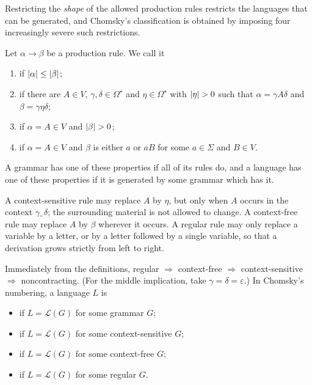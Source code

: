 \documentclass[a4paper]{scrartcl}
\newcommand{\lang}{\mathcal{L}}
\newcommand{\eps}{\varepsilon}
\begin{document}
Restricting the \emph{shape} of the allowed production rules restricts the languages that can be generated, and Chomsky's classification is obtained by imposing four increasingly severe such restrictions.

\begin{definition}
	Let $\alpha \to \beta$ be a production rule. We call it
	\begin{enumerate}[label=(\roman*)]
		\item {} if $\lvert\alpha\rvert \leq \lvert\beta\rvert$;
		\item {} if there are $A \in V$, $\gamma, \delta \in \Omega^\star$ and $\eta \in \Omega^\star$ with $\lvert\eta\rvert > 0$ such that $\alpha = \gamma A \delta$ and $\beta = \gamma\eta\delta$;
		\item {} if $\alpha = A \in V$ and $\lvert\beta\rvert > 0$;
		\item {} if $\alpha = A \in V$ and $\beta$ is either $a$ or $aB$ for some $a \in \Sigma$ and $B \in V$.
	\end{enumerate}
	A grammar has one of these properties if all of its rules do, and a language has one of these properties if it is generated by some grammar which has it.
\end{definition}

A context-sensitive rule may replace $A$ by $\eta$, but only when $A$ occurs in the context $\gamma \_\, \delta$; the surrounding material is not allowed to change. A context-free rule may replace $A$ by $\beta$ wherever it occurs. A regular rule may only replace a variable by a letter, or by a letter followed by a single variable, so that a derivation grows strictly from left to right.

Immediately from the definitions, regular $\Rightarrow$ context-free $\Rightarrow$ context-sensitive $\Rightarrow$ noncontracting. (For the middle implication, take $\gamma = \delta = \eps$.) In Chomsky's numbering, a language $L$ is
\begin{itemize}
	\item {} if $L = \lang(G)$ for some grammar $G$;
	\item {} if $L = \lang(G)$ for some context-sensitive $G$;
	\item {} if $L = \lang(G)$ for some context-free $G$;
	\item {} if $L = \lang(G)$ for some regular $G$.
\end{itemize}
\end{document}
